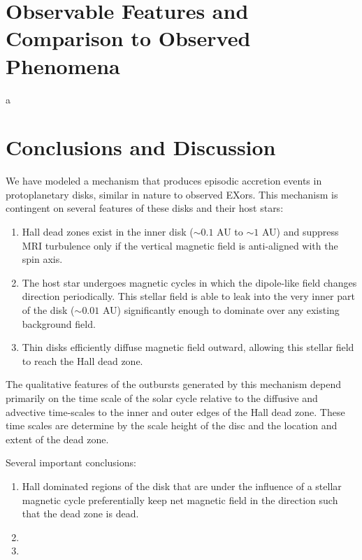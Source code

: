  





\newpage
\section{Observable Features and Comparison to Observed Phenomena}
a




\newpage
\section{Conclusions and Discussion}
We have modeled a mechanism that produces episodic accretion events in protoplanetary disks, similar in nature to observed EXors.  This mechanism is contingent on several features of these disks and their host stars:
\begin{enumerate}
\item{Hall dead zones exist in the inner disk ($\sim 0.1$ AU to $\sim 1$ AU) and suppress MRI turbulence only if the vertical magnetic field is anti-aligned with the spin axis. }
\item{The host star undergoes magnetic cycles in which the dipole-like field changes direction periodically.  This stellar field is able to leak into the very inner part of the disk ($\sim 0.01$ AU) significantly enough to dominate over any existing background field.}
\item{Thin disks efficiently diffuse magnetic field outward, allowing this stellar field to reach the Hall dead zone.}
\end{enumerate}

The qualitative features of the outbursts generated by this mechanism depend primarily on the time scale of the solar cycle relative to the diffusive and advective time-scales to the inner and outer edges of the Hall dead zone.  These time scales are determine by the scale height of the disc and the location and extent of the dead zone.

Several important conclusions:
\begin{enumerate}
\item{Hall dominated regions of the disk that are under the influence of a stellar magnetic cycle preferentially keep net magnetic field in the direction such that the dead zone is dead.}
\item{}
\item{}
\end{enumerate}
















